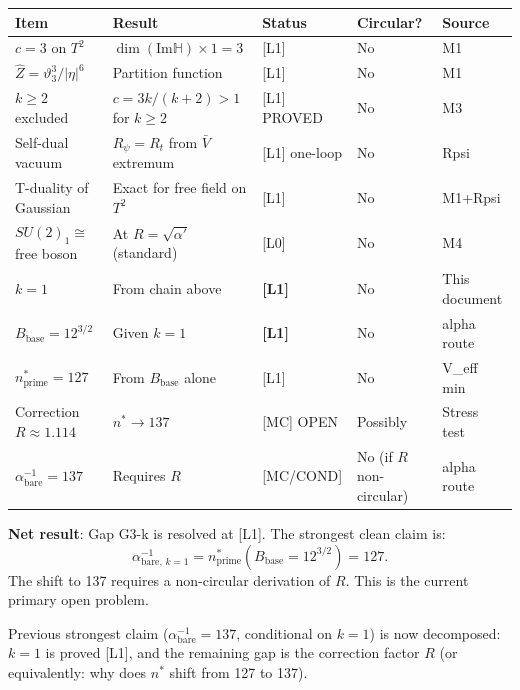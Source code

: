 \documentclass[12pt,a4paper]{article}
\theoremstyle{definition}
\theoremstyle{remark}
\begin{document}
\begin{center}
\renewcommand{\arraystretch}{1.35}
\begin{tabular}{lllll}
\toprule
Item & Result & Status & Circular? & Source \\
\midrule
$c = 3$ on $T^2$ & $\dim(\mathrm{Im}\mathbb{H})\times 1 = 3$ & [L1] & No & M1 \\
$\hat{Z} = \vartheta_3^3/|\eta|^6$ & Partition function & [L1] & No & M1 \\
$k\geq 2$ excluded & $c=3k/(k+2)>1$ for $k\geq 2$ & [L1] PROVED & No & M3 \\
Self-dual vacuum & $R_\psi = R_t$ from $\bar{V}$ extremum & [L1] one-loop & No & Rpsi \\
T-duality of Gaussian & Exact for free field on $T^2$ & [L1] & No & M1+Rpsi \\
$SU(2)_1\cong$ free boson & At $R=\sqrt{\alpha'}$ (standard) & [L0] & No & M4 \\
$k = 1$ & From chain above & \textbf{[L1]} & No & This document \\
$B_{\mathrm{base}} = 12^{3/2}$ & Given $k=1$ & \textbf{[L1]} & No & alpha route \\
$n^*_{\mathrm{prime}} = 127$ & From $B_{\mathrm{base}}$ alone & [L1] & No & V\_eff min \\
Correction $R\approx 1.114$ & $n^*\to 137$ & [MC] OPEN & Possibly & Stress test \\
$\alpha^{-1}_{\mathrm{bare}} = 137$ & Requires $R$ & [MC/COND] & No (if $R$ non-circular) & alpha route \\
\bottomrule
\end{tabular}
\end{center}

\begin{resultbox}
\textbf{Net result}:
Gap G3-k is resolved at [L1].  The strongest clean claim is:
\begin{equation}
  \alpha^{-1}_{\mathrm{bare},\,k=1}
  = n^*_{\mathrm{prime}}(B_{\mathrm{base}} = 12^{3/2})
  = 127.
  \label{eq:g3k:alpha_127}
\end{equation}
The shift to 137 requires a non-circular derivation of $R$.
This is the current primary open problem.

Previous strongest claim ($\alpha^{-1}_{\mathrm{bare}} = 137$, conditional on
$k=1$) is now decomposed: $k=1$ is proved [L1], and the remaining gap is
the correction factor $R$ (or equivalently: why does $n^*$ shift from 127 to 137).
\end{resultbox}

\ifdefined\INCLUDEMODE
\else
  
\end{document}
